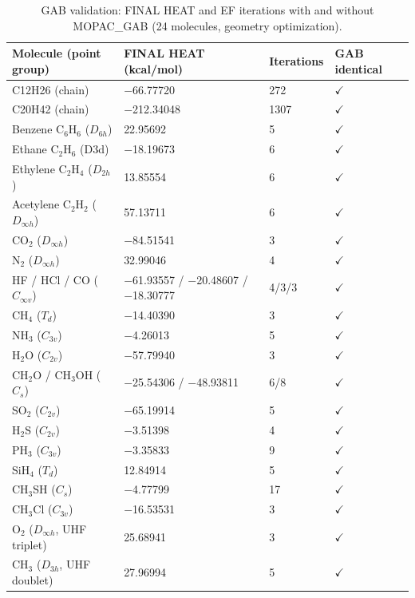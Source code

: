 \documentclass[preprint,12pt]{elsarticle}
\begin{document}
\begin{table}[htbp]
\centering
\caption{GAB validation: FINAL HEAT and EF iterations with and without MOPAC\_GAB (24 molecules, geometry optimization).}
\label{tab:GABvalidationFIN}
\begin{tabular}{llll}
\hline
\textbf{Molecule (point group)} & \textbf{FINAL HEAT (kcal/mol)} & \textbf{Iterations} & \textbf{GAB identical} \\
\hline
C12H26 (chain) & $-$66.77720 & 272 & $\checkmark$ \\
C20H42 (chain) & $-$212.34048 & 1307 & $\checkmark$ \\
Benzene C$_{6}$H$_{6}$ ($D_{6h}$) & 22.95692 & 5 & $\checkmark$ \\
Ethane C$_{2}$H$_{6}$ (D3d) & $-$18.19673 & 6 & $\checkmark$ \\
Ethylene C$_{2}$H$_{4}$ ($D_{2h}$) & 13.85554 & 6 & $\checkmark$ \\
Acetylene C$_{2}$H$_{2}$ ($D_{\infty h}$) & 57.13711 & 6 & $\checkmark$ \\
CO$_{2}$ ($D_{\infty h}$) & $-$84.51541 & 3 & $\checkmark$ \\
N$_{2}$ ($D_{\infty h}$) & 32.99046 & 4 & $\checkmark$ \\
HF / HCl / CO ($C_{\infty v}$) & $-$61.93557 / $-$20.48607 / $-$18.30777 & 4/3/3 & $\checkmark$ \\
CH$_{4}$ ($T_d$) & $-$14.40390 & 3 & $\checkmark$ \\
NH$_{3}$ ($C_{3v}$) & $-$4.26013 & 5 & $\checkmark$ \\
H$_{2}$O ($C_{2v}$) & $-$57.79940 & 3 & $\checkmark$ \\
CH$_{2}$O / CH$_{3}$OH ($C_s$) & $-$25.54306 / $-$48.93811 & 6/8 & $\checkmark$ \\
SO$_{2}$ ($C_{2v}$) & $-$65.19914 & 5 & $\checkmark$ \\
H$_{2}$S ($C_{2v}$) & $-$3.51398 & 4 & $\checkmark$ \\
PH$_{3}$ ($C_{3v}$) & $-$3.35833 & 9 & $\checkmark$ \\
SiH$_{4}$ ($T_d$) & 12.84914 & 5 & $\checkmark$ \\
CH$_{3}$SH ($C_s$) & $-$4.77799 & 17 & $\checkmark$ \\
CH$_{3}$Cl ($C_{3v}$) & $-$16.53531 & 3 & $\checkmark$ \\
O$_{2}$ ($D_{\infty h}$, UHF triplet) & 25.68941 & 3 & $\checkmark$ \\
CH$_{3}$ ($D_{3h}$, UHF doublet) & 27.96994 & 5 & $\checkmark$ \\
\hline
\end{tabular}
\end{table}
\end{document}
